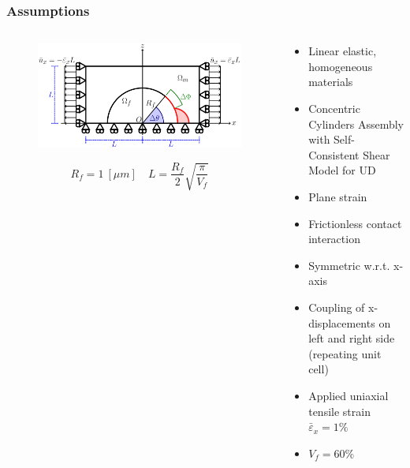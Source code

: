 \documentclass[first,firstsupp,lastsupp,last,hyperref,table]{ETHclass}
\begin{document}
\begin{frame}
\frametitle{\vspace{0.2cm}\small Assumptions}
\vspace{-0.75cm}
\centering
\begin{columns}
\begin{column}{0.5\textwidth}
\begin{figure}
\includegraphics[width=\columnwidth]{RUC.pdf}
\end{figure}
\vspace{-0.1cm}
\tiny
\begin{equation*}
R_{f}=1\ \left[\mu m\right]\quad L=\frac{R_{f}}{2}\sqrt{\frac{\pi}{V_{f}}}
\end{equation*}
\end{column}
\begin{column}{0.5\textwidth}
\scriptsize
\begin{itemize}[label=]
\item Linear elastic, homogeneous materials
\item Concentric Cylinders Assembly with Self-Consistent Shear Model for UD
\item Plane strain
\item Frictionless contact interaction
\item Symmetric w.r.t. x-axis
\item Coupling of x-displacements on left and right side (repeating unit cell)
\item Applied uniaxial tensile strain $\bar{\varepsilon}_{x}=1\%$
\item $V_{f}=60\%$
\end{itemize}
\end{column}
\end{columns}
\vspace{0.05cm}
\begin{table}[htbp]
\tiny
\centering
\begin{tabular}{ccccccc}

\end{tabular}
\end{table}
\end{frame}
\end{document}
